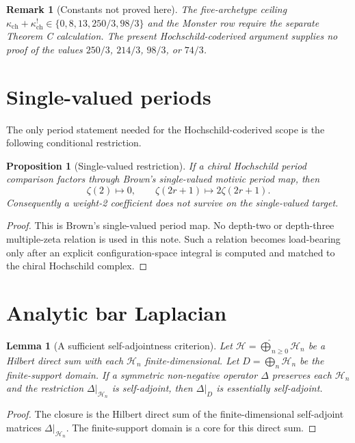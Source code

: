 \documentclass[11pt]{amsart}
\newtheorem{proposition}[theorem]{Proposition}
\newtheorem{lemma}[theorem]{Lemma}
\newtheorem{remark}[theorem]{Remark}
\newcommand{\kch}{\kappa_{\mathrm{ch}}}
\begin{document}
\begin{remark}[Constants not proved here]
The five-archetype ceiling
$\kch+\kch^!\in\{0,8,13,250/3,98/3\}$ and the Monster row require the
separate Theorem C calculation.  The present Hochschild-coderived
argument supplies no proof of the values $250/3$, $214/3$, $98/3$, or
$74/3$.
\end{remark}

\section{Single-valued periods}

The only period statement needed for the Hochschild-coderived scope is
the following conditional restriction.

\begin{proposition}[Single-valued restriction]
\label{prop:sv-restriction}
If a chiral Hochschild period comparison factors through Brown's
single-valued motivic period map, then
\[
 \zeta(2)\mapsto0,\qquad
 \zeta(2r+1)\mapsto 2\zeta(2r+1).
\]
Consequently a weight-2 coefficient does not survive on the
single-valued target.
\end{proposition}

\begin{proof}
This is Brown's single-valued period map.  No depth-two or depth-three
multiple-zeta relation is used in this note.  Such a relation becomes
load-bearing only after an explicit configuration-space integral is
computed and matched to the chiral Hochschild complex.
\end{proof}

\section{Analytic bar Laplacian}

\begin{lemma}[A sufficient self-adjointness criterion]
\label{lem:bar-laplacian-sufficient}
Let
$\mathcal H=\widehat{\bigoplus}_{n\geq0}\mathcal H_n$ be a Hilbert
direct sum with each $\mathcal H_n$ finite-dimensional.  Let
$D=\bigoplus_n\mathcal H_n$ be the finite-support domain.  If a
symmetric non-negative operator $\Delta$ preserves each $\mathcal H_n$
and the restriction $\Delta|_{\mathcal H_n}$ is self-adjoint, then
$\Delta|_D$ is essentially self-adjoint.
\end{lemma}

\begin{proof}
The closure is the Hilbert direct sum of the finite-dimensional
self-adjoint matrices $\Delta|_{\mathcal H_n}$.  The finite-support
domain is a core for this direct sum.
\end{proof}
\end{document}
